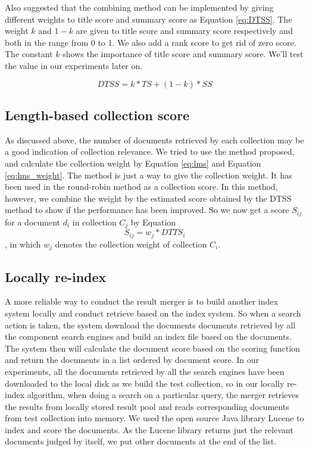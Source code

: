 Also \cite{Rasolofo2003} suggested that the combining method can be implemented by giving different weights to title score and summary score as Equation \eqref{eq:DTSS}. The weight $k$ and $1-k$ are given to title score and summary score respectively and both in the range from 0 to 1. We also add a rank score to get rid of zero score. The constant $k$ shows the importance of title score and summary score. We'll test the value in our experiments later on.

\begin{equation}
\label{eq:DTSS}
DTSS=k*TS+(1-k)*SS
\end{equation}

\subsection{Length-based collection score}
As discussed above, the number of documents retrieved by each collection may be a good indication of collection relevance. We tried to use the method \cite{Rasolofo2001} proposed, and calculate the collection weight by Equation \eqref{eq:lms} and Equation \eqref{eq:lms_weight}. The method is just a way to give the collection weight. It has been used in the round-robin method as a collection score. In this method, however, we combine the weight by the estimated score obtained by the DTSS method to show if the performance has been improved. So we now get a score $S_{ij}$ for a document $d_i$ in collection $C_j$ by Equation 
\begin{equation}
\label{eq:lms_dtts}
S_{ij}=w_j*DTTS_i
\end{equation}
, in which $w_j$ denotes the collection weight of collection $C_i$.

\subsection{Locally re-index}
A more reliable way to conduct the result merger is to build another index system locally and conduct retrieve based on the index system. So when a search action is taken, the system download the documents documents retrieved by all the component search engines and build an index file based on the documents. The system then will calculate the document score based on the scoring function and return the documents in a list ordered by document score. In our experiments, all the documents retrieved by all the search engines have been downloaded to the local disk as we build the test collection, so in our locally re-index algorithm, when doing a search on a particular query, the merger retrieves the results from locally stored result pool and reads corresponding documents from test collection into memory. We used the open source Java library Lucene to index and score the documents. As the Lucene library returns just the relevant documents judged by itself, we put other documents at the end of the list.

